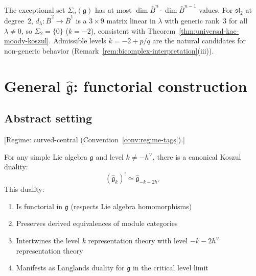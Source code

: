 \begin{remark}
\label{rem:special-level-values}
The exceptional set $\Sigma_n(\mathfrak{g})$ has at most $\dim\bar{B}^n \cdot \dim\bar{B}^{n-1}$ values.  For $\mathfrak{sl}_2$ at degree~$2$, $d_\lambda\colon \bar{B}^2 \to \bar{B}^1$ is a $3 \times 9$ matrix linear in $\lambda$ with generic rank~$3$ for all $\lambda \neq 0$, so $\Sigma_2 = \{0\}$ ($k = -2$), consistent with Theorem~\textup{\ref{thm:universal-kac-moody-koszul}}.  Admissible levels $k = -2 + p/q$ are the natural candidates for non-generic behavior (Remark~\textup{\ref{rem:bicomplex-interpretation}}\textup{(iii)}).
\end{remark}

\section{\texorpdfstring{General $\widehat{\mathfrak{g}}$: functorial construction}{General g: functorial construction}}

\subsection{Abstract setting}

\begin{theorem}\label{thm:universal-kac-moody-koszul}
\textup{[Regime: curved-central
\textup{(}Convention~\textup{\ref{conv:regime-tags})}.]}

For any simple Lie algebra $\mathfrak{g}$ and level $k \neq -h^\vee$, there is a canonical Koszul duality:
\begin{equation}
(\widehat{\mathfrak{g}}_k)^! \simeq \widehat{\mathfrak{g}}_{-k-2h^\vee}
\end{equation}
This duality:
\begin{enumerate}
\item Is functorial in $\mathfrak{g}$ (respects Lie algebra homomorphisms)
\item Preserves derived equivalences of module categories
\item Intertwines the level $k$ representation theory with level $-k-2h^\vee$ representation theory
\item Manifests as Langlands duality for $\mathfrak{g}$ in the critical level limit
\end{enumerate}
\end{theorem}

